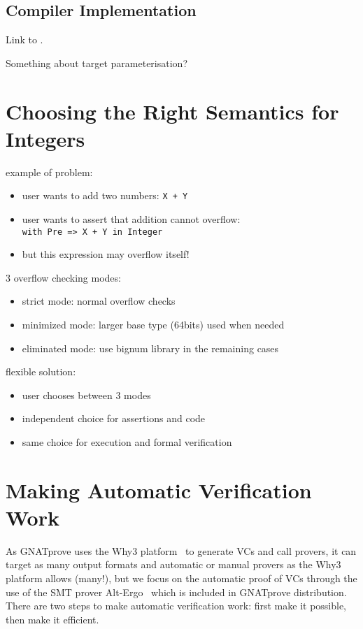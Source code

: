 \documentclass[sttt,draft]{svjour}
\newcommand{\gnatprove}{GNATprove\xspace}
\begin{document}
\subsection{Compiler Implementation}
Link to \cite{ksd2012}.

Something about target parameterisation?

\section{Choosing the Right Semantics for Integers}
\label{overflowsemantics}
\cite{jotChalin04}

example of problem:
\begin{itemize}
\item user wants to add two numbers: \verb|X + Y|
\item user wants to assert that addition cannot overflow:\\
  \verb|with Pre => X + Y in Integer|
\item but this expression may overflow itself!
\end{itemize}

3 overflow checking modes:
\begin{itemize}
\item strict mode: normal overflow checks
\item minimized mode: larger base type (64bits) used when needed
\item eliminated mode: use bignum library in the remaining cases
\end{itemize}

flexible solution:
\begin{itemize}
\item user chooses between 3 modes
\item independent choice for assertions and code
\item same choice for execution and formal verification
\end{itemize}

\section{Making Automatic Verification Work}
\label{automation}

As \gnatprove uses the Why3 platform~\cite{why3} to generate VCs and call
provers, it can target as many output formats and automatic or manual provers
as the Why3 platform allows (many!), but we focus on the automatic proof of VCs
through the use of the SMT prover Alt-Ergo~\cite{altergo} which is included in
\gnatprove distribution. There are two steps to make automatic verification
work: first make it possible, then make it efficient.
\end{document}
